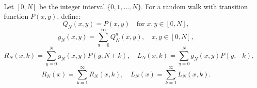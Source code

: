 Let \([0,N]\) be the integer interval \(\{0,1,\dots,N\}\). For a random walk with transition function \(P(x,y)\), define:
\[
Q_N(x,y) = P(x,y) \quad \text{for } x,y \in [0,N],
\]
\[
g_N(x,y) = \sum_{n=0}^{\infty} Q_N^n(x,y), \quad x,y \in [0,N],
\]
\[
R_N(x,k) = \sum_{y=0}^{N} g_N(x,y) P(y,N+k), \quad L_N(x,k) = \sum_{y=0}^{N} g_N(x,y) P(y,-k),
\]
\[
R_N(x) = \sum_{k=1}^{\infty} R_N(x,k), \quad L_N(x) = \sum_{k=1}^{\infty} L_N(x,k).
\]
